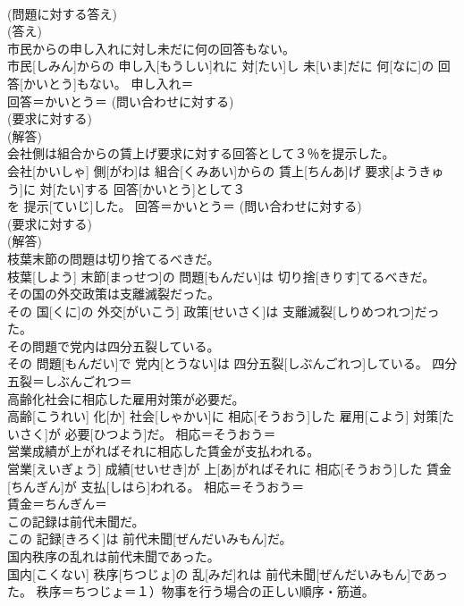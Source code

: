 \documentclass[8pt]{extreport}
\begin{document}
\begin{CJK}{UTF8}{min}
\\	(問題に対する答え) 
\\	(答え)
\\	市民からの申し入れに対し未だに何の回答もない。	
\\	市民[しみん]からの 申し入[もうしい]れに 対[たい]し 未[いま]だに 何[なに]の 回答[かいとう]もない。	申し入れ＝ 
\\	回答＝かいとう＝ (問い合わせに対する) 
\\	(要求に対する) 
\\	(解答)
\\	会社側は組合からの賃上げ要求に対する回答として３％を提示した。	
\\	会社[かいしゃ] 側[がわ]は 組合[くみあい]からの 賃上[ちんあ]げ 要求[ようきゅう]に 対[たい]する 回答[かいとう]として３ 
\\	[ぱーせんと]を 提示[ていじ]した。	回答＝かいとう＝ (問い合わせに対する) 
\\	(要求に対する) 
\\	(解答)
\\	枝葉末節の問題は切り捨てるべきだ。	
\\	枝葉[しよう] 末節[まっせつ]の 問題[もんだい]は 切り捨[きりす]てるべきだ。	
\\	その国の外交政策は支離滅裂だった。	
\\	その 国[くに]の 外交[がいこう] 政策[せいさく]は 支離滅裂[しりめつれつ]だった。	
\\	その問題で党内は四分五裂している。	
\\	その 問題[もんだい]で 党内[とうない]は 四分五裂[しぶんごれつ]している。	四分五裂＝しぶんごれつ＝ 
\\	高齢化社会に相応した雇用対策が必要だ。	
\\	高齢[こうれい] 化[か] 社会[しゃかい]に 相応[そうおう]した 雇用[こよう] 対策[たいさく]が 必要[ひつよう]だ。	相応＝そうおう＝ 
\\	営業成績が上がればそれに相応した賃金が支払われる。	
\\	営業[えいぎょう] 成績[せいせき]が 上[あ]がればそれに 相応[そうおう]した 賃金[ちんぎん]が 支払[しはら]われる。	相応＝そうおう＝ 
\\	賃金＝ちんぎん＝ 
\\	この記録は前代未聞だ。	
\\	この 記録[きろく]は 前代未聞[ぜんだいみもん]だ。	
\\	国内秩序の乱れは前代未聞であった。	
\\	国内[こくない] 秩序[ちつじょ]の 乱[みだ]れは 前代未聞[ぜんだいみもん]であった。	秩序＝ちつじょ＝１）物事を行う場合の正しい順序・筋道。 　　　　　　　　

\end{CJK}
\end{document}
